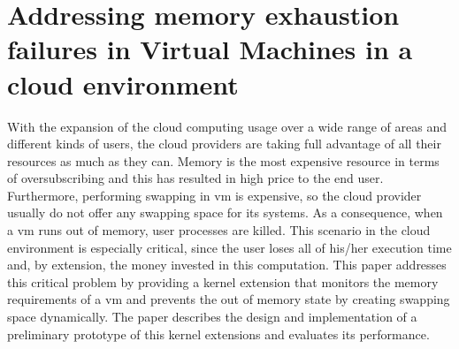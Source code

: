 \glsresetall

\section{Addressing memory exhaustion failures in Virtual Machines in a cloud environment}\label{section_memory_exhaustion}

With the expansion of the cloud computing usage over a wide range of areas and different kinds
of users, the cloud providers are taking full advantage of all their resources as much as they can.
Memory is the most expensive resource in terms of oversubscribing and this has resulted in high
price to the end user. Furthermore, performing swapping in \gls{vm} is expensive, so the cloud
provider usually do not offer any swapping space for its systems. As a consequence, when a \gls{vm}
runs out of memory, user processes are killed. This scenario in the cloud environment is
especially critical, since the user loses all of his/her execution time and, by extension,
the money invested in this computation. This paper addresses this critical problem by providing
a kernel extension that monitors the memory requirements of a \gls{vm} and prevents the out
of memory state by creating swapping space dynamically. The paper describes the design and
implementation of a preliminary prototype of this kernel extensions and evaluates its
performance.

